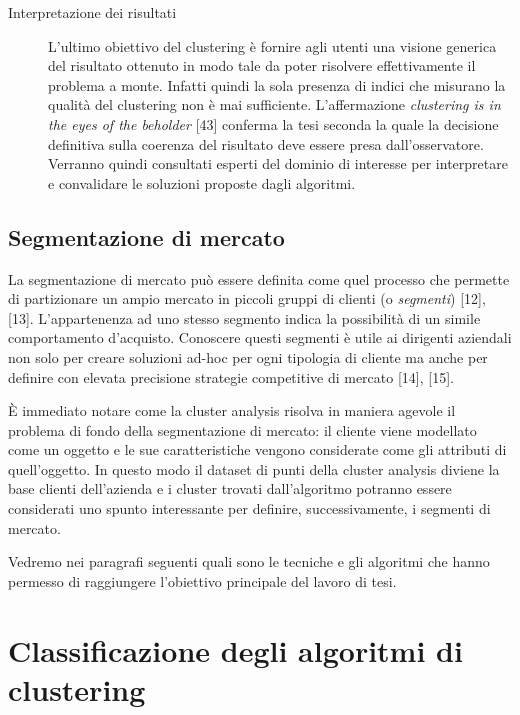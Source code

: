 \begin{description}
\item[Interpretazione dei risultati] L'ultimo obiettivo del clustering \`e fornire agli utenti una visione generica del risultato ottenuto in modo tale da poter risolvere effettivamente il problema a monte. Infatti quindi la sola presenza di indici che misurano la qualit\`a del clustering non \`e mai sufficiente. L'affermazione \textit{clustering is in the eyes of the beholder} [43] conferma la tesi seconda la quale la decisione definitiva sulla coerenza del risultato deve essere presa dall'osservatore. Verranno quindi consultati esperti del dominio di interesse per interpretare e convalidare le soluzioni proposte dagli algoritmi.
\end{description}

\subsection{Segmentazione di mercato}
La segmentazione di mercato pu\`o essere definita come quel processo che permette di partizionare un ampio mercato in piccoli gruppi di clienti (o \textit{segmenti}) [12], [13]. L'appartenenza ad uno stesso segmento indica la possibilit\`a di un simile comportamento d'acquisto. Conoscere questi segmenti \`e utile ai dirigenti aziendali non solo per creare soluzioni ad-hoc per ogni tipologia di cliente ma anche per definire con elevata precisione strategie competitive di mercato [14], [15].

\`E immediato notare come la cluster analysis risolva in maniera agevole il problema di fondo della segmentazione di mercato: il cliente viene modellato come un oggetto e le sue caratteristiche vengono considerate come gli attributi di quell'oggetto. In questo modo il dataset di punti della cluster analysis diviene la base clienti dell'azienda e i cluster trovati dall'algoritmo potranno essere considerati uno spunto interessante per definire, successivamente, i segmenti di mercato.

Vedremo nei paragrafi seguenti quali sono le tecniche e gli algoritmi che hanno permesso di raggiungere l'obiettivo principale del lavoro di tesi.

\section{Classificazione degli algoritmi di clustering}
